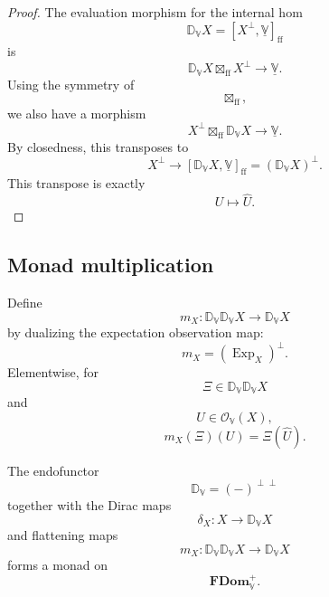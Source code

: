 \begin{proof}
The evaluation morphism for the internal hom
\[
    \mathbb D_{\mathbb V}X
    =
    [X^{\perp},\underline{\mathbb V}]_{\mathrm{ff}}
\]
is
\[
    \mathbb D_{\mathbb V}X
    \boxtimes_{\mathrm{ff}}
    X^{\perp}
    \to
    \underline{\mathbb V}.
\]
Using the symmetry of
\[
    \boxtimes_{\mathrm{ff}},
\]
we also have a morphism
\[
    X^{\perp}
    \boxtimes_{\mathrm{ff}}
    \mathbb D_{\mathbb V}X
    \to
    \underline{\mathbb V}.
\]
By closedness, this transposes to
\[
    X^{\perp}
    \to
    [\mathbb D_{\mathbb V}X,\underline{\mathbb V}]_{\mathrm{ff}}
    =
    (\mathbb D_{\mathbb V}X)^{\perp}.
\]
This transpose is exactly
\[
    U\mapsto\widehat U.
\]
\end{proof}

\subsection{Monad multiplication}
\label{subsec:monad-multiplication-fuzzy-distributions}

\begin{definition}[Flattening]
\label{def:fuzzy-distribution-flattening}
Define
\[
    m_X:
    \mathbb D_{\mathbb V}\mathbb D_{\mathbb V}X
    \to
    \mathbb D_{\mathbb V}X
\]
by dualizing the expectation observation map:
\[
    m_X
    =
    (\operatorname{Exp}_X)^{\perp}.
\]
Elementwise, for
\[
    \Xi\in\mathbb D_{\mathbb V}\mathbb D_{\mathbb V}X
\]
and
\[
    U\in\mathcal O_{\mathbb V}(X),
\]
\[
    m_X(\Xi)(U)
    =
    \Xi(\widehat U).
\]
\end{definition}

\begin{theorem}
\label{thm:fuzzy-distribution-monad}
The endofunctor
\[
    \mathbb D_{\mathbb V}
    =
    (-)^{\perp\perp}
\]
together with the Dirac maps
\[
    \delta_X:X\to\mathbb D_{\mathbb V}X
\]
and flattening maps
\[
    m_X:\mathbb D_{\mathbb V}\mathbb D_{\mathbb V}X
    \to
    \mathbb D_{\mathbb V}X
\]
forms a monad on
\[
    \mathbf{FDom}_{\mathbb V}^{+}.
\]
\end{theorem}

